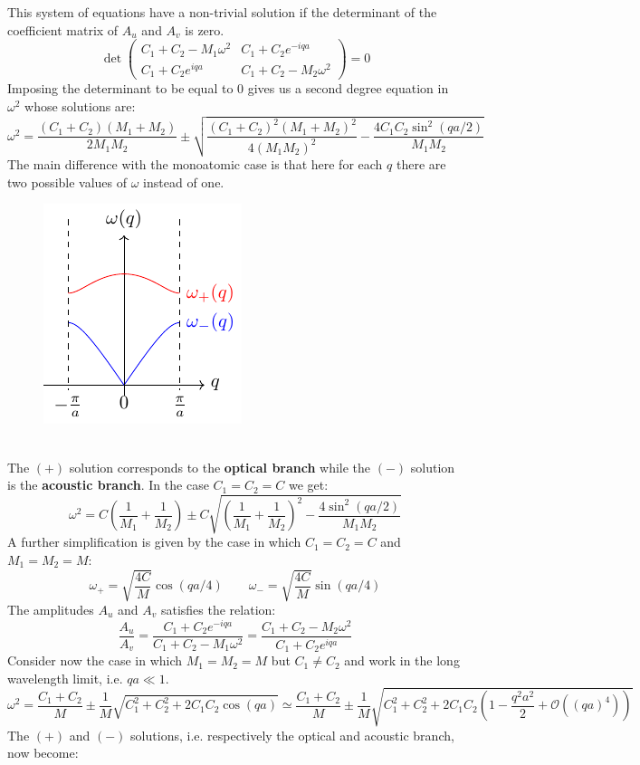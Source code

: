 \documentclass[10.75pt,a4paper,openright,bottom=2cm]{article}
\begin{document}
This system of equations have a non-trivial solution if the determinant of the coefficient matrix of $A_u$ and $A_v$ is zero.
\[
\det\left(\begin{array}{cc}
    C_1+C_2-M_1\omega^2 & C_1+C_2e^{-iqa} \\
    C_1+C_2e^{iqa} & C_1+C_2-M_2\omega^2
\end{array}\right)=0
\]
Imposing the determinant to be equal to 0 gives us a second degree equation in $\omega^2$ whose solutions are:
\[
\omega^2=\frac{(C_1+C_2)(M_1+M_2)}{2M_1M_2}\pm\sqrt{\frac{(C_1+C_2)^2(M_1+M_2)^2}{4(M_1M_2)^2}-\frac{4C_1C_2\sin^2(qa/2)}{M_1M_2}}
\]
The main difference with the monoatomic case is that here for each $q$ there are two possible values of $\omega$ instead of one.
\begin{figure}[h]
    \centering
    \includegraphics{omega+-.pdf}
    \label{fig:omega+-}
\end{figure}\\
\noindent
The $(+)$ solution corresponds to the \textbf{optical branch} while the $(-)$ solution is the \textbf{acoustic branch}. In the case $C_1=C_2=C$ we get:
\[
\omega^2=C\left(\frac{1}{M_1}+\frac{1}{M_2}\right)\pm C\sqrt{\left(\frac{1}{M_1}+\frac{1}{M_2}\right)^2-\frac{4\sin^2(qa/2)}{M_1M_2}}
\]
A further simplification is given by the case in which $C_1=C_2=C$ and $M_1=M_2=M$:
\[
\omega_+=\sqrt{\frac{4C}{M}}\cos(qa/4) \qquad \omega_-=\sqrt{\frac{4C}{M}}\sin(qa/4)
\]
The amplitudes $A_u$ and $A_v$ satisfies the relation:
\[
\frac{A_u}{A_v}=\frac{C_1+C_2e^{-iqa}}{C_1+C_2-M_1\omega^2}=\frac{C_1+C_2-M_2\omega^2}{C_1+C_2e^{iqa}}
\]
Consider now the case in which $M_1=M_2=M$ but $C_1\neq C_2$ and work in the long wavelength limit, i.e. $qa\ll1$.
\[
\omega^2=\frac{C_1+C_2}{M}\pm\frac{1}{M}\sqrt{C_1^2+C_2^2+2C_1C_2\cos(qa)}\simeq\frac{C_1+C_2}{M}\pm\frac{1}{M}\sqrt{C_1^2+C_2^2+2C_1C_2\left(1-\frac{q^2a^2}{2}+\mathcal{O}((qa)^4)\right)}
\]
The $(+)$ and $(-)$ solutions, i.e. respectively the optical and acoustic branch, now become:
\end{document}
